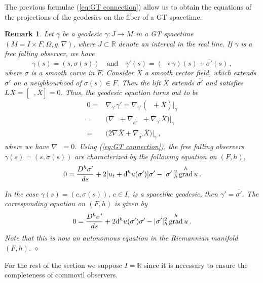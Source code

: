 \documentclass[12pt]{article}
\newcommand{\mfrac}[2]{\mbox{\footnotesize$\displaystyle\frac{#1}{#2}$}}
\newcommand{\diff}{\mathrm{d}}
\newcommand{\quand}{\quad\text{and}\quad}
\DeclareMathOperator{\pt}{\partial_t}
\DeclareMathOperator{\grad}{grad}
\newtheorem{rem}[defi]{Remark}
\def\R{\mathbb R}
\begin{document}
The previous formulae (\ref{eq:GT connection}) allow us to obtain the equations of the projections of the geodesics on the fiber of a GT spacetime. 
\begin{rem}
\upshape
    Let $\gamma$ be a geodesic $\gamma: J\longrightarrow M$ in a GT spacetime $(M=I\times F, \Omega, g, \nabla)$, where $J\subset\R$ denote an interval in the real line. If $\gamma$ is a free falling observer, we have
    \[
        \gamma(s) = (s, \sigma(s)) \quand \gamma'(s) = (\pt \circ \gamma) (s) + \overline{\sigma'}(s)\,,
    \]
    where $\sigma$ is a smooth curve in $F$. Consider $X$ a smooth vector field, which extends $\sigma'$ on a neighbourhood of $\sigma(s)\in F$. Then the lift $\overline{X}$ extends $\overline{\sigma'}$ and satisfies $L_{\pt} \overline{X} = [\pt, \overline{X}] = 0$. Thus, the geodesic equation turns out to be
    \begin{equation*}
    \begin{split}
        0 ={}& \nabla_{\gamma'} \gamma' = \nabla_{\gamma'} (\pt + \overline{X})|_\gamma \\
        ={}& \big(\nabla_{\pt} \pt + \nabla_{\overline{\sigma'}} \pt + \nabla_{\gamma'} \overline{X} \big)|_\gamma \\
        ={}& \big(2\nabla_{\pt} \overline{X} + \nabla_{\overline{\sigma'}} \overline{X}\big)|_\gamma\,,
    \end{split}
    \end{equation*}
    where we have $\nabla_{\pt} \pt=0$. Using (\ref{eq:GT connection}), 
    the free falling observers $\gamma(s) = (s,\sigma(s))$ are characterized by the following equation on $(F,h)$,
    \begin{equation}\label{eq:completeness 1}
        0 = \mfrac{D^h \sigma'}{ds} + 2[u_t + \diff^h u(\sigma')] \sigma' - |\sigma'|^2_h \grad^h u\,.
    \end{equation}

    In the case $\gamma(s) = (c,\sigma(s))$, $c\in I$, is a spacelike geodesic, then $\gamma'=\overline{\sigma'}$. The corresponding equation on $(F,h)$ is given by
    \begin{equation}\label{eq:completeness spacelike}
        0 = \mfrac{D^h \sigma'}{ds} + 2\diff^h u(\sigma') \sigma' - |\sigma'|^2_h \grad^h u\,.
    \end{equation}
    Note that this is now an autonomous equation in the Riemannian manifold $(F,h)$. 
    \hfill $\diamond$
\end{rem}
For the rest of the section we suppose $I=\R$ since it is necessary to ensure the completeness of commovil observers.
\end{document}
